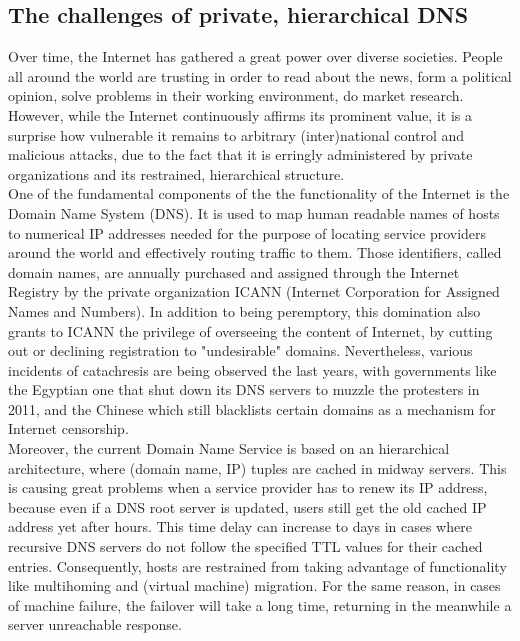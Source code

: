 \documentclass[12pt,a4paper,oneside]{article}
\begin{document}
\newpage
\subsection{The challenges of private, hierarchical DNS}
Over time, the Internet has gathered a great power over diverse societies. People all around the world are trusting in order to read about the news, form a political opinion, solve problems in their working environment, do market research. However, while the Internet continuously affirms its prominent value, it is a surprise how vulnerable it remains to arbitrary (inter)national control and malicious attacks, due to the fact that it is erringly administered by private organizations and its restrained, hierarchical structure. \\
\indent One of the fundamental components of the the functionality of the Internet is the Domain Name System (DNS). It is used to map human readable names of hosts to numerical IP addresses needed for the purpose of locating service providers around the world and effectively routing traffic to them. Those identifiers, called domain names, are annually purchased and assigned through the Internet Registry by the private organization ICANN (Internet Corporation for Assigned Names and Numbers). In addition to being peremptory, this domination also grants to ICANN the privilege of overseeing the content of Internet, by cutting out or declining registration to "undesirable" domains. Nevertheless, various incidents of catachresis are being observed the last years, with governments like the Egyptian one that shut down its DNS servers to muzzle the protesters in 2011, and the Chinese which still blacklists certain domains as a mechanism for Internet censorship.\\
\indent Moreover, the current Domain Name Service is based on an hierarchical architecture, where (domain name, IP) tuples are cached in midway servers. This is causing great problems when a service provider has to renew its IP address, because even if a DNS root server is updated, users still get the old cached IP address yet after hours. This time delay can increase to days in cases where recursive DNS servers do not follow the specified TTL values for their cached entries. Consequently, hosts are restrained from taking advantage of functionality like multihoming and (virtual machine) migration. For the same reason, in cases of machine failure, the failover will take a long time, returning in the meanwhile a server unreachable response. \\
\end{document}
